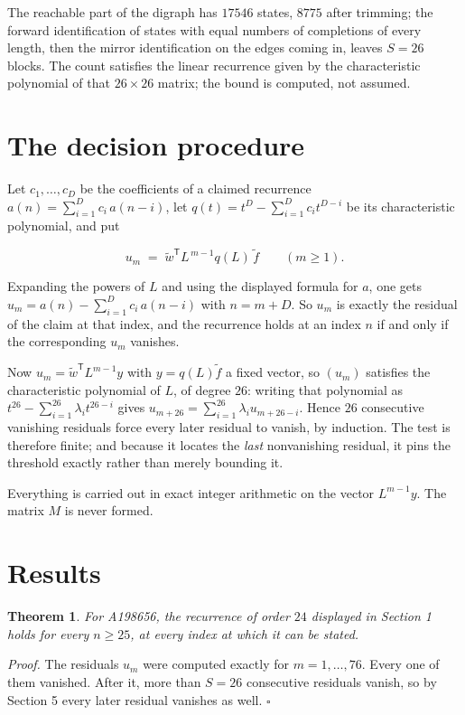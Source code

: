 \documentclass[11pt]{article}
\newtheorem{theorem}{Theorem}
\theoremstyle{definition}
\begin{document}
The reachable part of the digraph has $17546$ states, $8775$ after trimming; the forward identification of states with equal numbers of completions of every length, then the mirror identification on the edges coming in, leaves $S = 26$ blocks. The count satisfies the linear recurrence given by the characteristic polynomial of that $26\times26$ matrix; the bound is computed, not assumed.

\section{The decision procedure}

Let $c_1,\dots,c_D$ be the coefficients of a claimed recurrence $a(n) = \sum_{i=1}^{D} c_i\,a(n-i)$, let $q(t) = t^{D} - \sum_{i=1}^{D} c_i t^{D-i}$ be its characteristic polynomial, and put

\[u_m \;=\; \tilde w^{\mathsf T} L^{\,m-1} q(L)\,\tilde f \qquad (m \ge 1).\]

Expanding the powers of $L$ and using the displayed formula for $a$, one gets $u_m = a(n) - \sum_{i=1}^{D} c_i\,a(n-i)$ with $n = m + D$. So $u_m$ is exactly the residual of the claim at that index, and the recurrence holds at an index $n$ if and only if the corresponding $u_m$ vanishes.

Now $u_m = \tilde w^{\mathsf T} L^{m-1} y$ with $y = q(L)\tilde f$ a fixed vector, so $(u_m)$ satisfies the characteristic polynomial of $L$, of degree $26$: writing that polynomial as $t^{26} - \sum_{i=1}^{26} \lambda_i t^{26-i}$ gives $u_{m+26} = \sum_{i=1}^{26} \lambda_i u_{m+26-i}$. Hence $26$ consecutive vanishing residuals force every later residual to vanish, by induction. The test is therefore finite; and because it locates the {\itshape last} nonvanishing residual, it pins the threshold exactly rather than merely bounding it.

Everything is carried out in exact integer arithmetic on the vector $L^{m-1}y$. The matrix $M$ is never formed.

\section{Results}

\begin{theorem} For A198656, the recurrence of order $24$ displayed in Section 1 holds for every $n \ge 25$, at every index at which it can be stated.\end{theorem}

{\itshape Proof.} The residuals $u_m$ were computed exactly for $m = 1,\dots,76$. Every one of them vanished. After it, more than $S = 26$ consecutive residuals vanish, so by Section 5 every later residual vanishes as well. $\square$
\end{document}
